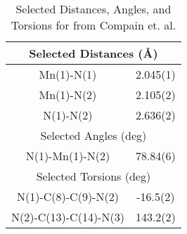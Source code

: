 \begin{table}[htbp]
  \caption[Selected Distances, Angles and Torsions from a Mn Analogue]{Selected Distances, Angles, and Torsions for \texorpdfstring{}{Bidentate Terpyridine Tricarbonyl Mn Br} from Compain et. al.}
  \centering
    \begin{tabular}{cc}
    \toprule
    \multicolumn{2}{c}{Selected Distances (\r{A})} \\
    \midrule
	Mn(1)-N(1) & 2.045(1) \\
	Mn(1)-N(2) & 2.105(2) \\
	N(1)-N(2) & 2.636(2) \\ \midrule
    \multicolumn{2}{c}{Selected Angles (deg)} \\ \midrule
    N(1)-Mn(1)-N(2) & 78.84(6) \\ \midrule
    \multicolumn{2}{c}{Selected Torsions (deg)} \\ \midrule
    N(1)-C(8)-C(9)-N(2) & -16.5(2) \\
    N(2)-C(13)-C(14)-N(3) & 143.2(2) \\
    \bottomrule
    \end{tabular}%
  \label{tab.damnbr}%
\end{table}%


